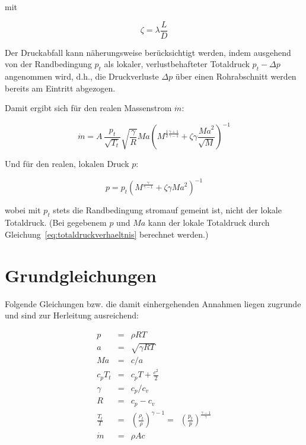 \documentclass[a4paper,10pt,twocolumn]{article}
\begin{document}
mit 

\begin{equation}
\zeta = \lambda \frac{L}{D}
\end{equation}

Der Druckabfall kann näherungsweise berücksichtigt werden, indem ausgehend von der Randbedingung $p_t$ als lokaler, verlustbehafteter Totaldruck $p_t - \Delta p$ angenommen wird, d.h., die Druckverluste $\Delta p$ über einen Rohrabschnitt werden bereits am Eintritt abgezogen.

Damit ergibt sich für den realen Massenstrom $\dot m$:

\begin{equation}
\dot m = A \, \frac{p_t}{\sqrt{T_t}} \sqrt{\frac{\gamma}{R}} \mathit{Ma} \left( M^{ \frac{1}{2}\frac{\gamma + 1}{\gamma - 1}} + \zeta \gamma \frac{\mathit{Ma}^2}{\sqrt{M}} \right) ^{-1}
\end{equation}

Und für den realen, lokalen Druck $p$:

\begin{equation}
p = p_t \left( M^\frac{\gamma}{\gamma-1} + \zeta \gamma \mathit{Ma}^2 \right)^{-1}
\end{equation}

\noindent wobei mit $p_t$ stets die Randbedingung stromauf gemeint ist, nicht der lokale Totaldruck. (Bei gegebenem $p$ und $\mathit{Ma}$ kann der lokale Totaldruck durch Gleichung~\ref{eq:totaldruckverhaeltnis} berechnet werden.)


\section{Grundgleichungen}

Folgende Gleichungen bzw. die damit einhergehenden Annahmen liegen zugrunde und sind zur Herleitung ausreichend:

\begin{eqnarray}
p &=& \rho R T \\
a &=& \sqrt{\gamma R T} \\
\mathit{Ma} &=& c/a \\
c_p T_t &=& c_p T + \frac{c^2}{2} \\
\gamma &=& c_p / c_v \\
R &=& c_p - c_v \\
\frac{T_t}{T} &=& \left( \frac{\rho_t}{\rho} \right)^{\gamma-1} =\,\,\, \left( \frac{p_t}{p} \right)^\frac{\gamma-1}{\gamma} \\
\dot m &=& \rho A c
\end{eqnarray}
\end{document}
